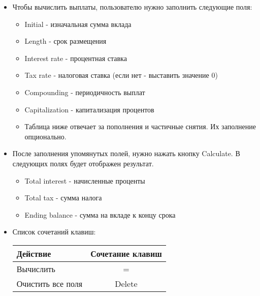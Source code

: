 \documentclass[
]{article}
\providecommand{\tightlist}{%
  \setlength{\itemsep}{0pt}\setlength{\parskip}{0pt}}
\begin{document}
\begin{itemize}
\item
  Чтобы вычислить выплаты, пользователю нужно заполнить следующие поля:

  \begin{itemize}
  \tightlist
  \item
    Initial - изначальная сумма вклада
  \item
    Length - срок размещения
  \item
    Interest rate - процентная ставка
  \item
    Tax rate - налоговая ставка (если нет - выставить значение 0)
  \item
    Compounding - периодичность выплат
  \item
    Capitalization - капитализация процентов
  \item
    Таблица ниже отвечает за пополнения и частичные снятия. Их
    заполнение опционально.
  \end{itemize}
\item
  После заполнения упомянутых полей, нужно нажать кнопку Calculate. В
  следующих полях будет отображен результат.

  \begin{itemize}
  \tightlist
  \item
    Total interest - начисленные проценты
  \item
    Total tax - сумма налога
  \item
    Ending balance - сумма на вкладе к концу срока
  \end{itemize}
\item
  Список сочетаний клавиш:

  \begin{longtable}[]{@{}lc@{}}
  \toprule\noalign{}
  Действие & Сочетание клавиш \\
  \midrule\noalign{}
  \endhead
  \bottomrule\noalign{}
  \endlastfoot
  Вычислить & = \\
  Очистить все поля & Delete \\
  \end{longtable}
\end{itemize}
\end{document}

